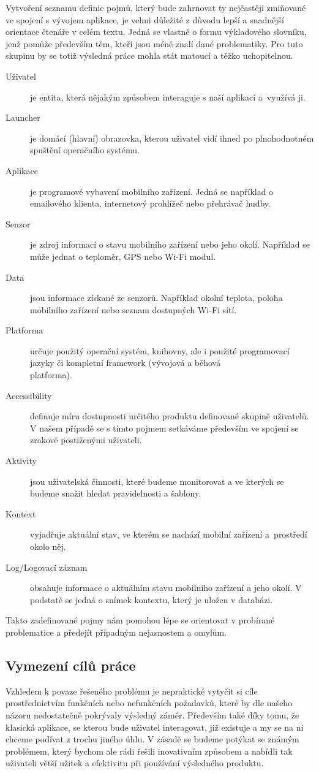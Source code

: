 \documentclass[thesis=M,czech]{FITthesis}[2012/06/26]
\begin{document}
\begin{introduction}
Vytvoření seznamu definic pojmů, který bude zahrnovat ty nejčastěji zmiňované ve spojení s vývojem aplikace, je velmi důležité z důvodu lepší a snadnější orientace čtenáře v celém textu. Jedná se vlastně o formu výkladového slovníku, jenž pomůže především těm, kteří jsou méně znalí dané problematiky. Pro tuto skupinu by se totiž výsledná práce mohla stát matoucí a těžko uchopitelnou.

\begin{description}
\item[Uživatel] je entita, která nějakým způsobem interaguje s naší aplikací a~využívá ji.
\item[Launcher] je domácí (hlavní) obrazovka, kterou uživatel vidí ihned po plnohodnotném spuštění operačního systému.\cite{launcher}
\item[Aplikace] je programové vybavení mobilního zařízení. Jedná se například o emailového klienta, internetový prohlížeč nebo přehrávač hudby.
\item[Senzor] je zdroj informací o stavu mobilního zařízení nebo jeho okolí. Například se může jednat o teploměr, GPS nebo Wi-Fi modul.
\item[Data] jsou informace získané ze senzorů. Například okolní teplota, poloha mobilního zařízení nebo seznam dostupných Wi-Fi sítí.
\item[Platforma] určuje použitý operační systém, knihovny, ale i použité programovací jazyky či kompletní framework (vývojová a běhová \\platforma).\cite{platform}
\item[Accessibility] definuje míru dostupnosti určitého produktu definované skupině uživatelů. V našem případě se s tímto pojmem setkáváme především ve spojení se zrakově postiženými uživateli.
\item[Aktivity] jsou uživatelská činnosti, které budeme monitorovat a ve kterých se budeme snažit hledat pravidelnosti a šablony.
\item[Kontext] vyjadřuje aktuální stav, ve kterém se nachází mobilní zařízení a~prostředí okolo něj.
\item[Log/Logovací záznam] obsahuje informace o aktuálním stavu mobilního zařízení a jeho okolí. V podstatě se jedná o snímek kontextu, který je uložen v databázi.
\end{description}

Takto zadefinované pojmy nám pomohou lépe se orientovat v probírané problematice a předejít případným nejasnostem a omylům.

\subsection{Vymezení cílů práce}
Vzhledem k povaze řešeného problému je nepraktické vytyčit si cíle prostřednictvím funkčních nebo nefunkčních požadavků, které by dle našeho názoru nedostatečně pokrývaly výsledný záměr. Především také díky tomu, že klasická aplikace, se kterou bude uživatel interagovat, již existuje a my se na ni chceme podívat z trochu jiného úhlu. V zásadě se budeme potýkat se známým problémem, který bychom ale rádi řešili inovativním způsobem a nabídli tak uživateli větší užitek a efektivitu při používání výsledného produktu.


\end{introduction}
\end{document}
